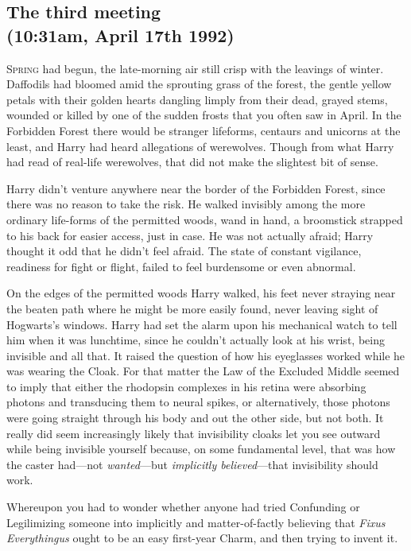 
\subsection{The third meeting\\
(10:31am, April 17th 1992)}

\lettrine{S}{pring} had begun, the late-morning air still crisp with the leavings of winter. 
Daffodils had bloomed amid the sprouting grass of the forest, the gentle yellow 
petals with their golden hearts dangling limply from their dead, grayed stems, 
wounded or killed by one of the sudden frosts that you often saw in April. In 
the Forbidden Forest there would be stranger lifeforms, centaurs and unicorns 
at the least, and Harry had heard allegations of werewolves. Though from what 
Harry had read of real-life werewolves, that did not make the slightest bit of 
sense.

Harry didn't venture anywhere near the border of the Forbidden Forest, since 
there was no reason to take the risk. He walked invisibly among the more 
ordinary life-forms of the permitted woods, wand in hand, a broomstick strapped 
to his back for easier access, just in case. He was not actually afraid; Harry 
thought it odd that he didn't feel afraid. The state of constant vigilance, 
readiness for fight or flight, failed to feel burdensome or even abnormal.

On the edges of the permitted woods Harry walked, his feet never straying near 
the beaten path where he might be more easily found, never leaving sight of 
Hogwarts's windows. Harry had set the alarm upon his mechanical watch to tell 
him when it was lunchtime, since he couldn't actually look at his wrist, being 
invisible and all that. It raised the question of how his eyeglasses worked 
while he was wearing the Cloak. For that matter the Law of the Excluded Middle 
seemed to imply that either the rhodopsin complexes in his retina were 
absorbing photons and transducing them to neural spikes, or alternatively, 
those photons were going straight through his body and out the other side, but 
not both. It really did seem increasingly likely that invisibility cloaks let 
you see outward while being invisible yourself because, on some fundamental 
level, that was how the caster had---not \emph{wanted}---but \emph{implicitly 
believed}---that invisibility should work.

Whereupon you had to wonder whether anyone had tried Confunding or Legilimizing 
someone into implicitly and matter-of-factly believing that \emph{Fixus 
Everythingus} ought to be an easy first-year Charm, and then trying to invent 
it.

